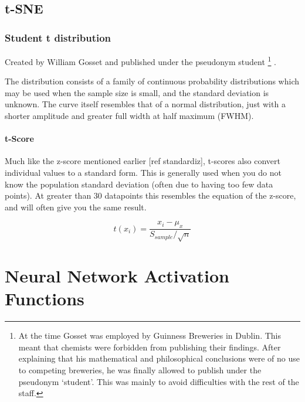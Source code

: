 \section {t-SNE} \label{apendix:tsne}

\subsection{Student t distribution}

Created by William Gosset and published under the pseudonym student \footnote{ At the time Gosset was employed by Guinness Breweries in Dublin. This meant that chemists were forbidden from publishing their findings. After explaining that his mathematical and philosophical conclusions were of no use to competing breweries, he was finally allowed to publish under the pseudonym `student'. This was mainly to avoid difficulties with the rest of the staff.} \cite{student}.

The distribution consists of a family of continuous probability distributions which may be used when the sample size is small, and the standard deviation is unknown. The curve itself resembles that of a normal distribution, just with a shorter amplitude and greater full width at half maximum (FWHM).


\subsubsection{t-Score}
Much like the z-score mentioned earlier [ref standardiz], t-scores also convert individual values to a standard form. This is generally used when you do not know the population standard deviation (often due to having too few data points). At greater than 30 datapoints this resembles the equation of the z-score, and will often give you the same result.


\begin{equation}
    t(x_i) = \frac{x_i - \mu_x}{S_{sample}/\sqrt{n} }
    \label{eqn:t}
\end{equation}
%
%


\chapter{Neural Network Activation Functions}\label{appendix:activation}


